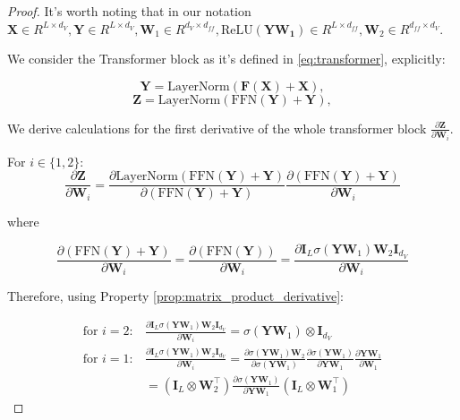 \documentclass{article}
\begin{document}
\begin{proof}
It's worth noting that in our notation $\mathbf{X} \in R^{L \times d_V}, \mathbf{Y} \in R^{L\times d_V}, \mathbf{W}_1 \in R^{d_V \times d_{ff}}, \text{ReLU}(\mathbf{Y\mathbf{W}_1}) \in R^{L \times d_{ff}}, \mathbf{W}_2 \in R^{d_{ff} \times d_V} $.
 
We consider the Transformer block as it's defined in \ref{eq:transformer}, explicitly:

\[
\mathbf{Y} = \text{LayerNorm}(\mathbf{F}(\mathbf{X}) + \mathbf{X}),
\]
\[
\mathbf{Z} = \text{LayerNorm}(\text{FFN}(\mathbf{Y}) + \mathbf{Y}),
\]

We derive calculations for the first derivative of the whole transformer block $\frac{\partial\mathbf{Z}}{\partial \mathbf{W}_i}$. 

For $i \in \{1,2\}$:
\begin{equation*}
    \frac{\partial\mathbf{Z}}{\partial \mathbf{W}_i} = \frac{\partial \text{LayerNorm}(\text{FFN}(\mathbf{Y}) + \mathbf{Y})}{\partial (\text{FFN}(\mathbf{Y}) + \mathbf{Y})} \frac{\partial (\text{FFN}(\mathbf{Y}) + \mathbf{Y})}{\partial \mathbf{W}_i}
\end{equation*}

where 

\begin{equation*}
    \frac{\partial (\text{FFN}(\mathbf{Y}) + \mathbf{Y})}{\partial \mathbf{W}_i} = \frac{\partial (\text{FFN}(\mathbf{Y}))}{\partial \mathbf{W}_i} = \frac{\partial \mathbf{I}_L \sigma(\mathbf{Y}\mathbf{W}_1)\mathbf{W}_2 \mathbf{I}_{d_V}}{\partial \mathbf{W}_i}
\end{equation*}

Therefore, using Property \ref{prop:matrix_product_derivative}:

\begin{align*}
    \text{for } i = 2:&
    \frac{\partial \mathbf{I}_L \sigma(\mathbf{Y}\mathbf{W}_1)\mathbf{W}_2 \mathbf{I}_{d_V}}{\partial \mathbf{W}_i} = \sigma(\mathbf{Y} \mathbf{W}_1) \otimes \mathbf{I}_{d_V}\\
    \text{for } i = 1:& \frac{\partial \mathbf{I}_L \sigma(\mathbf{Y}\mathbf{W}_1)\mathbf{W}_2 \mathbf{I}_{d_V}}{\partial \mathbf{W}_i} = \frac{\partial \sigma(\mathbf{Y}\mathbf{W}_1) \mathbf{W}_2}{\partial \sigma(\mathbf{Y}\mathbf{W}_1)} \frac{\partial \sigma(\mathbf{Y}\mathbf{W}_1)}{\partial \mathbf{Y}\mathbf{W}_1} \frac{\partial \mathbf{Y}\mathbf{W}_1}{\partial \mathbf{W}_1} \\
    &= \left(\mathbf{I}_L \otimes \mathbf{W}_2^\top \right) \frac{\partial \sigma(\mathbf{Y}\mathbf{W}_1)}{\partial \mathbf{Y}\mathbf{W}_1} \left( \mathbf{I}_L \otimes \mathbf{W}_1^\top\right)
\end{align*}


\end{proof}
\end{document}
